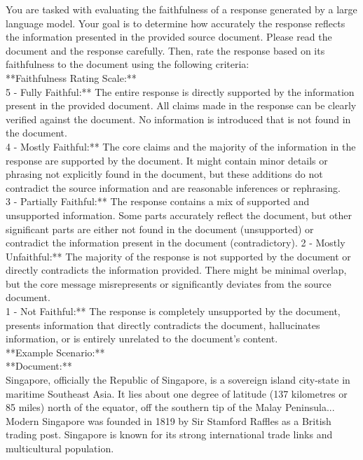 
\begin{tcolorbox}[
    enhanced,
    colback=white, %
    colframe=black, %
    arc=5mm, %
    boxrule=1pt,
    left=2mm, %
    right=2mm, %
    top=1mm, %
    bottom=1mm %
]

You are tasked with evaluating the faithfulness of a response generated by a large language model. Your goal is to determine how accurately the response reflects the information presented in the provided source document. Please read the document and the response carefully. Then, rate the response based on its faithfulness to the document using the following criteria:\\

**Faithfulness Rating Scale:**\\
5 - Fully Faithful:** The entire response is directly supported by the information present in the provided document. All claims made in the response can be clearly verified against the document. No information is introduced that is not found in the document.\\
4 - Mostly Faithful:** The core claims and the majority of the information in the response are supported by the document. It might contain minor details or phrasing not explicitly found in the document, but these additions do not contradict the source information and are reasonable inferences or rephrasing.\\
3 - Partially Faithful:** The response contains a mix of supported and unsupported information. Some parts accurately reflect the document, but other significant parts are either not found in the document (unsupported) or contradict the information present in the document (contradictory).
2 - Mostly Unfaithful:** The majority of the response is not supported by the document or directly contradicts the information provided. There might be minimal overlap, but the core message misrepresents or significantly deviates from the source document.\\
1 - Not Faithful:** The response is completely unsupported by the document, presents information that directly contradicts the document, hallucinates information, or is entirely unrelated to the document's content.\\
**Example Scenario:**\\
**Document:**\\
Singapore, officially the Republic of Singapore, is a sovereign island city-state in maritime Southeast Asia. It lies about one degree of latitude (137 kilometres or 85 miles) north of the equator, off the southern tip of the Malay Peninsula... Modern Singapore was founded in 1819 by Sir Stamford Raffles as a British trading post. Singapore is known for its strong international trade links and multicultural population.\\

\end{tcolorbox}
